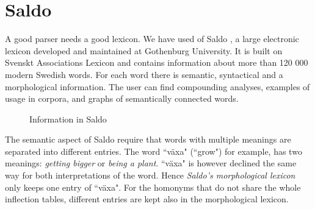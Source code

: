 \documentclass{report}
\begin{document}
\section{Saldo}
\label{sec:saldo}
A good parser needs a good lexicon. We have used of Saldo \cite{saldo}, a
large electronic lexicon developed and maintained at Gothenburg University. It is
built on Svenskt Associations Lexicon and contains information about more than 
120 000 modern Swedish words.
For each word there is semantic, syntactical and a morphological
information. The user can find compounding analyses, examples of usage in corpora,
and graphs of semantically connected words.\\
\begin{figure}[h!]
\centering
{}
\hspace{20mm}
\caption{Information in Saldo}
\label{fig:saldo}
\end{figure}

The semantic aspect of Saldo require that words with multiple meanings are
separated into different entries.
The word ``växa" (``grow") for example, has two meanings: \emph{getting
bigger}
or \emph{being a plant}. 
``växa" is however declined the same way for both interpretations of the word.
Hence \textit{Saldo's morphological lexicon} only keeps one entry of ``växa".
For the homonyms that do not share the whole inflection tables, different entries are 
kept also in the morphological lexicon.
\end{document}
